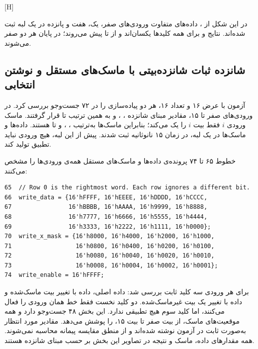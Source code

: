 [H]

در این شکل از ، داده‌های متفاوت ورودی‌های صفر، یک، هفت و پانزده در یک لبه ثبت شده‌اند. نتایج  و  برای همه کلیدها یکسان‌اند و از  تا  پیش می‌روند؛ در پایان هر دو صفر می‌شوند.

\subsection{شانزده ثبات شانزده‌بیتی با ماسک‌های مستقل و نوشتن انتخابی}

آزمون  با عرض ۱۶ و تعداد ۱۶، هر دو پیاده‌سازی را در ۷۲ جست‌وجو بررسی کرد. در ورودی‌های صفر تا ۱۵، مقادیر مبنای شانزده ، ،  و به همین ترتیب تا  قرار گرفتند. ماسک ورودی $i$ فقط بیت $i$ را یک می‌کند؛ بنابراین ماسک‌ها به‌ترتیب ، ،  و تا  هستند. داده‌ها و ماسک‌ها در یک لبه، در زمان ۱۵ نانوثانیه ثبت شدند. پیش از این لبه، هیچ ورودی نباید تطبیق تولید کند.

خطوط ۶۵ تا ۷۴ پرونده‌ی  داده‌ها و ماسک‌های مستقل همه‌ی ورودی‌ها را مشخص می‌کنند:

\begin{dsdlcodeblock}
\begin{verbatim}
65  // Row 0 is the rightmost word. Each row ignores a different bit.
66  write_data = {16'hFFFF, 16'hEEEE, 16'hDDDD, 16'hCCCC,
67                16'hBBBB, 16'hAAAA, 16'h9999, 16'h8888,
68                16'h7777, 16'h6666, 16'h5555, 16'h4444,
69                16'h3333, 16'h2222, 16'h1111, 16'h0000};
70  write_x_mask = {16'h8000, 16'h4000, 16'h2000, 16'h1000,
71                  16'h0800, 16'h0400, 16'h0200, 16'h0100,
72                  16'h0080, 16'h0040, 16'h0020, 16'h0010,
73                  16'h0008, 16'h0004, 16'h0002, 16'h0001};
74  write_enable = 16'hFFFF;
\end{verbatim}
\end{dsdlcodeblock}

برای هر ورودی سه کلید ثابت بررسی شد: داده اصلی، داده با تغییر بیت ماسک‌شده و داده با تغییر یک بیت غیرماسک‌شده. دو کلید نخست فقط خط همان ورودی را فعال می‌کنند، اما کلید سوم هیچ تطبیقی ندارد. این بخش ۴۸ جست‌وجو دارد و همه موقعیت‌های ماسک، از بیت صفر تا بیت ۱۵، را پوشش می‌دهد. مقادیر مورد انتظار به‌صورت ثابت در آزمون نوشته شده‌اند و از منطق مقایسه پیمانه محاسبه نمی‌شوند. همه مقدارهای داده، ماسک و نتیجه در تصاویر این بخش بر حسب مبنای شانزده هستند.

